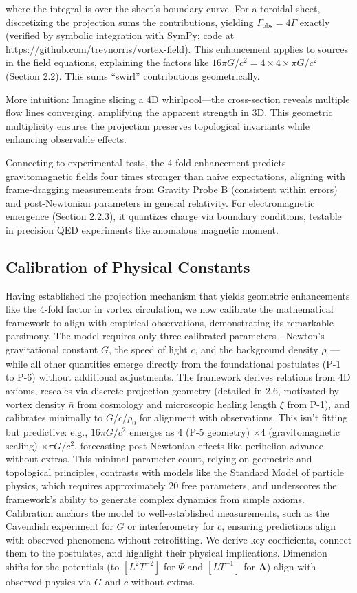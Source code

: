where the integral is over the sheet's boundary curve. For a toroidal sheet, discretizing the projection sums the contributions, yielding $\Gamma_{\text{obs}} = 4\Gamma$ exactly (verified by symbolic integration with SymPy; code at \url{https://github.com/trevnorris/vortex-field}). This enhancement applies to sources in the field equations, explaining the factors like $16\pi G/c^2 = 4 \times 4 \times \pi G/c^2$ (Section 2.2). This sums ``swirl'' contributions geometrically.

More intuition: Imagine slicing a 4D whirlpool—the cross-section reveals multiple flow lines converging, amplifying the apparent strength in 3D. This geometric multiplicity ensures the projection preserves topological invariants while enhancing observable effects.

Connecting to experimental tests, the 4-fold enhancement predicts gravitomagnetic fields four times stronger than naive expectations, aligning with frame-dragging measurements from Gravity Probe B (consistent within errors) and post-Newtonian parameters in general relativity. For electromagnetic emergence (Section 2.2.3), it quantizes charge via boundary conditions, testable in precision QED experiments like anomalous magnetic moment.

\subsection{Calibration of Physical Constants}

Having established the projection mechanism that yields geometric enhancements like the 4-fold factor in vortex circulation, we now calibrate the mathematical framework to align with empirical observations, demonstrating its remarkable parsimony. The model requires only three calibrated parameters---Newton's gravitational constant $G$, the speed of light $c$, and the background density $\rho_0$---while all other quantities emerge directly from the foundational postulates (P-1 to P-6) without additional adjustments. The framework derives relations from 4D axioms, rescales via discrete projection geometry (detailed in 2.6, motivated by vortex density $\bar{n}$ from cosmology and microscopic healing length $\xi$ from P-1), and calibrates minimally to $G$/$c$/$\rho_0$ for alignment with observations. This isn't fitting but predictive: e.g., $16\pi G/c^2$ emerges as $4$ (P-5 geometry) $\times 4$ (gravitomagnetic scaling) $\times \pi G/c^2$, forecasting post-Newtonian effects like perihelion advance without extras. This minimal parameter count, relying on geometric and topological principles, contrasts with models like the Standard Model of particle physics, which requires approximately 20 free parameters, and underscores the framework's ability to generate complex dynamics from simple axioms. Calibration anchors the model to well-established measurements, such as the Cavendish experiment for $G$ or interferometry for $c$, ensuring predictions align with observed phenomena without retrofitting. We derive key coefficients, connect them to the postulates, and highlight their physical implications. Dimension shifts for the potentials (to $[L^2 T^{-2}]$ for $\Psi$ and $[L T^{-1}]$ for $\mathbf{A}$) align with observed physics via $G$ and $c$ without extras.

